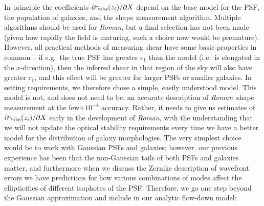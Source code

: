 \documentclass[usenatbib]{mnras}
\newcommand{\wfirst}{{\slshape Roman}}
\begin{document}
In principle the coefficients $\partial\gamma_{\rm obs}(z_i)/\partial X$ depend on the base model for the PSF, the population of galaxies, and the shape measurement algorithm. Multiple algorithms should be used for \wfirst, but a final selection has not been made (given how rapidly the field is maturing, such a choice now would be premature). However, all practical methods of measuring shear have some basic properties in common -- if e.g.\ the true PSF has greater $e_1$ than the model (i.e.\ is elongated in the $x$-direction), then the inferred shear in that region of the sky will also have greater $c_1$, and this effect will be greater for larger PSFs or smaller galaxies. In setting requirements, we therefore chose a simple, easily understood model. This model is not, and does not need to be, an accurate description of \wfirst\ shape measurement at the few$\times 10^{-4}$ accuracy. Rather, it needs to give us estimates of $\partial\gamma_{\rm obs}(z_i)/\partial X$ early in the development of \wfirst, with the understanding that we will not update the optical stability requirements every time we have a better model for the distribution of galaxy morphologies. The very simplest choice would be to work with Gaussian PSFs and galaxies; however, our previous experience has been that the non-Gaussian tails of both PSFs and galaxies matter, and furthermore when we discuss the Zernike description of wavefront errors we have predictions for how various combinations of modes affect the ellipticities of different isophotes of the PSF. Therefore, we go one step beyond the Gaussian approximation and include in our analytic flow-down model:
\end{document}
